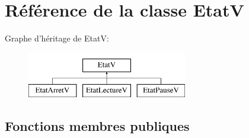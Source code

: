 \hypertarget{classEtatV}{\section{Référence de la classe Etat\+V}
\label{classEtatV}
}
Graphe d'héritage de Etat\+V\+:\begin{figure}[H]
\begin{center}
\leavevmode
\includegraphics[height=2.000000cm]{classEtatV}
\end{center}
\end{figure}
\subsection*{Fonctions membres publiques}
